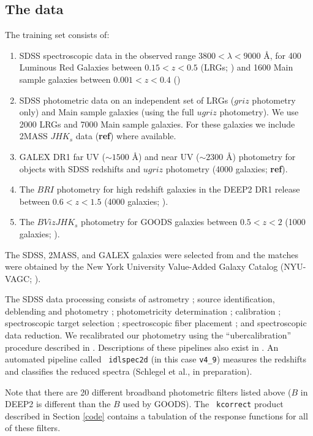 \documentclass[10pt,preprint]{aastex}
\begin{document}
\subsection{The data}

The training set consists of:
\begin{enumerate}
\item SDSS spectroscopic data in the observed range $3800 < \lambda <
9000$ \AA, for 400 Luminous Red Galaxies between $0.15 < z < 0.5$ (LRGs;
\citealt{eisenstein01a}) and 1600 Main sample galaxies between $0.001
< z < 0.4$ (\citealt{strauss02a})
\item SDSS photometric data on an independent set of LRGs ($griz$
photometry only) and Main sample galaxies (using the full $ugriz$
photometry). We use 2000 LRGs and 7000 Main sample galaxies.  For
these galaxies we include 2MASS $JHK_s$ data ({\bf ref}) where
available.
\item GALEX DR1 far UV ($\sim 1500$ \AA) and near UV ($\sim 2300$ \AA)
photometry for objects with SDSS redshifts and $ugriz$ photometry (4000
galaxies; {\bf ref}).
\item The $BRI$ photometry for high redshift galaxies in the DEEP2 
DR1 release between $0.6 < z < 1.5$ (4000
galaxies; \citealt{davis03a, faber03a}).
\item The $BVizJHK_s$ photometry for GOODS galaxies between $0.5 < z < 2$ (1000
galaxies; \citealt{giavalisco04a}).
\end{enumerate}
The SDSS, 2MASS, and GALEX galaxies were selected from and the matches
were obtained by the New York University Value-Added Galaxy Catalog
(NYU-VAGC;
\citealt{blanton05a}).  

The SDSS data processing consists of astrometry \citep{pier03a};
source identification, deblending and photometry \citep{lupton01a};
photometricity determination \citep{hogg01a}; calibration
\citep{fukugita96a,smith02a}; spectroscopic target selection
\citep{eisenstein01a,strauss02a,richards02a}; spectroscopic fiber
placement \citep{blanton03a}; and spectroscopic data reduction.  We
recalibrated our photometry using the ``ubercalibration'' procedure
described in \citet{blanton05a}.  Descriptions of these pipelines also
exist in \citet{stoughton02a}.  An automated pipeline called {\tt
idlspec2d} (in this case {\tt v4\_9}) measures the redshifts and
classifies the reduced spectra (Schlegel et al., in preparation).

Note that there are 20 different broadband photometric filters listed
above ($B$ in DEEP2 is different than the $B$ used by GOODS). The {\tt
kcorrect} product described in Section \ref{code} contains a
tabulation of the response functions for all of these filters.
\end{document}
